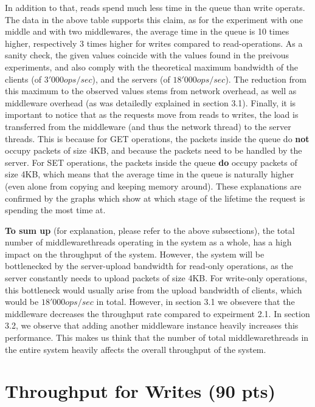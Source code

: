 \documentclass[11pt,a4paper]{article}
\begin{document}
In addition to that, reads spend much less time in the queue than write operats.
The data in the above table supports this claim, as for the experiment with one middle and with two middlewares, the average time in the queue is 10 times higher, respectively 3 times higher for writes compared to read-operations.
As a sanity check, the given values coincide with the values found in the preivous experiments, and also comply with the theoretical maximum bandwidth of the clients (of $3'000 ops/sec$), and the servers (of $18'000 ops/sec$).
The reduction from this maximum to the observed values stems from network overhead, as well as middleware overhead (as was detailedly explained in section 3.1).
Finally, it is important to notice that as the requests move from reads to writes, the load is transferred from the middleware (and thus the network thread) to the server threads.
This is because for GET operations, the packets inside the queue do \textbf{not} occupy packets of size 4KB, and because the packets need to be handled by the server.
For SET operations, the packets inside the queue \textbf{do} occupy packets of size 4KB,  which means that the average time in the queue is naturally higher (even alone from copying and keeping memory around).
These explanations are confirmed by the graphs which show at which stage of the lifetime the request is spending the most time at.

\textbf{To sum up} (for explanation, please refer to the above subsections), the total number of middlewarethreads operating in the system as a whole, has a high impact on the throughput of the system.
However, the system will be bottlenecked by the server-upload bandwidth for read-only operations, as the server constantly needs to upload packets of size 4KB.
For write-only operations, this bottleneck would usually arise from the upload bandwidth of clients, which would be $18'000 ops/sec$ in total.
However, in section 3.1 we obsevere that the middleware decreases the throughput rate compared to expeirment 2.1.
In section 3.2, we observe that adding another middleware instance heavily increases this performance.
This makes us think that the number of total middlewarethreads in the entire system heavily affects the overall throughput of the system.


\section{Throughput for Writes (90 pts)}
\end{document}
